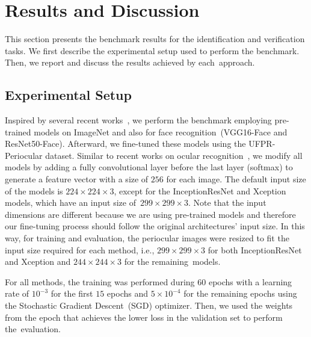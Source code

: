 \section{Results and Discussion}
\label{sec:results}

This section presents the benchmark results for the identification and verification tasks.
We first describe the experimental setup used to perform the benchmark.
Then, we report and discuss the results achieved by each~approach.

\subsection{Experimental Setup}

Inspired by several recent works~\cite{Luz2018, zanlorensi2018impact, reddy2018comparison, wang2019cross, boyd2019fine, zanlorensi2020deep, boutros2020fusing, diaz2020spectrum, hern2020crossspectral}, we perform the benchmark employing pre-trained models on ImageNet and also for face recognition~(VGG16-Face and ResNet50-Face).
Afterward, we fine-tuned these models using the UFPR-Periocular dataset.
Similar to recent works on ocular recognition~\cite{Luz2018, zanlorensi2018impact, silva2018multimodal, zanlorensi2019ocular}, we modify all models by adding a fully convolutional layer before the last layer (softmax) to generate a feature vector with a size of $256$ for each image.
The default input size of the models is $224\times224\times3$, except for the InceptionResNet and Xception models, which have an input size of~$299\times299\times3$. 
Note that the input dimensions are different because we are using pre-trained models and therefore our fine-tuning process should follow the original architectures' input size.
In this way, for training and evaluation, the periocular images were resized to fit the input size required for each method, i.e., $299\times299\times3$ for both InceptionResNet and Xception and $244\times244\times3$ for the remaining~models. 

For all methods, the training was performed during $60$ epochs with a learning rate of $10^{-3}$ for the first $15$ epochs and $5\times10^{-4}$ for the remaining epochs using the Stochastic Gradient Descent~(SGD) optimizer.
Then, we used the weights from the epoch that achieves the lower loss in the validation set to perform the~evaluation.

